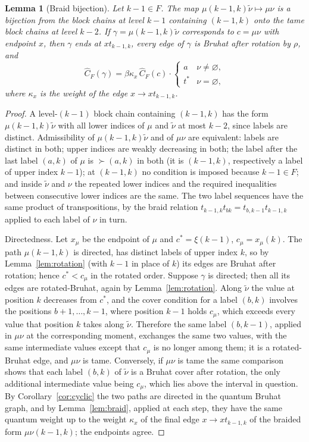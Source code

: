 \documentclass[11pt]{article}
\newtheorem{lemma}[proposition]{Lemma}
\begin{document}
\begin{lemma}[Braid bijection]\label{lem:braid-bijection}
Let $k-1\in F$. The map $\mu(k-1,k)\tilde\nu\mapsto\mu\nu$ is a
bijection from the block chains at level $k-1$ containing $(k-1,k)$
onto the tame block chains at level $k-2$. If $\gamma=\mu(k-1,k)\tilde\nu$
corresponds to $c=\mu\nu$ with endpoint $x$, then $\gamma$ ends at
$xt_{k-1,k}$, every edge of $\gamma$ is Bruhat after rotation by
$\rho$, and
\[
 \widehat C_F(\gamma)=\beta\kappa_x\,\widehat C_F(c)\cdot
 \begin{cases} a&\nu\neq\varnothing,\\ t^{\ast}&\nu=\varnothing,\end{cases}
\]
where $\kappa_x$ is the weight of the edge $x\to xt_{k-1,k}$.
\end{lemma}

\begin{proof}
A level-$(k-1)$ block chain containing $(k-1,k)$ has the form
$\mu(k-1,k)\tilde\nu$ with all lower indices of $\mu$ and $\tilde\nu$ at
most $k-2$, since labels are distinct. Admissibility of
$\mu(k-1,k)\tilde\nu$ and of $\mu\nu$ are equivalent: labels are
distinct in both; upper indices are weakly decreasing in both; the
label after the last label $(a,k)$ of $\mu$ is $\succ(a,k)$ in both
(it is $(k-1,k)$, respectively a label of upper index $k-1$); at
$(k-1,k)$ no condition is imposed because $k-1\in F$; and inside
$\tilde\nu$ and $\nu$ the repeated lower indices and the required
inequalities between consecutive lower indices are the same. The two
label sequences have the same product of transpositions, by the braid
relation $t_{k-1,k}t_{bk}=t_{b,k-1}t_{k-1,k}$ applied to each label of
$\nu$ in turn.

Directedness. Let $x_\mu$ be the endpoint of $\mu$ and $c^\ast=\xi(k-1)$,
$c_\mu=x_\mu(k)$. The path $\mu(k-1,k)$ is directed, has distinct
labels of upper index $k$, so by Lemma~\ref{lem:rotation} (with $k-1$
in place of $k$) its edges are Bruhat after rotation; hence
$c^\ast<c_\mu$ in the rotated order. Suppose $\gamma$ is directed; then
all its edges are rotated-Bruhat, again by Lemma~\ref{lem:rotation}. Along $\tilde\nu$ the value at
position $k$ decreases from $c^\ast$, and the cover condition for a
label $(b,k)$ involves the positions $b+1,\ldots,k-1$, where position
$k-1$ holds $c_\mu$, which exceeds every value that position $k$ takes
along $\tilde\nu$. Therefore the same label $(b,k-1)$, applied in
$\mu\nu$ at the corresponding moment, exchanges the same two values,
with the same intermediate values except that $c_\mu$ is no longer
among them; it is a rotated-Bruhat edge, and $\mu\nu$ is tame.
Conversely, if $\mu\nu$ is tame the same comparison shows that each
label $(b,k)$ of $\tilde\nu$ is a Bruhat cover after rotation, the only
additional intermediate value being $c_\mu$, which lies above the
interval in question. By Corollary~\ref{cor:cyclic} the two paths are
directed in the quantum Bruhat graph, and by Lemma~\ref{lem:braid},
applied at each step, they have the same quantum weight up to the
weight $\kappa_x$ of the final edge $x\to xt_{k-1,k}$ of the braided
form $\mu\nu(k-1,k)$; the endpoints agree.


\end{proof}
\end{document}
